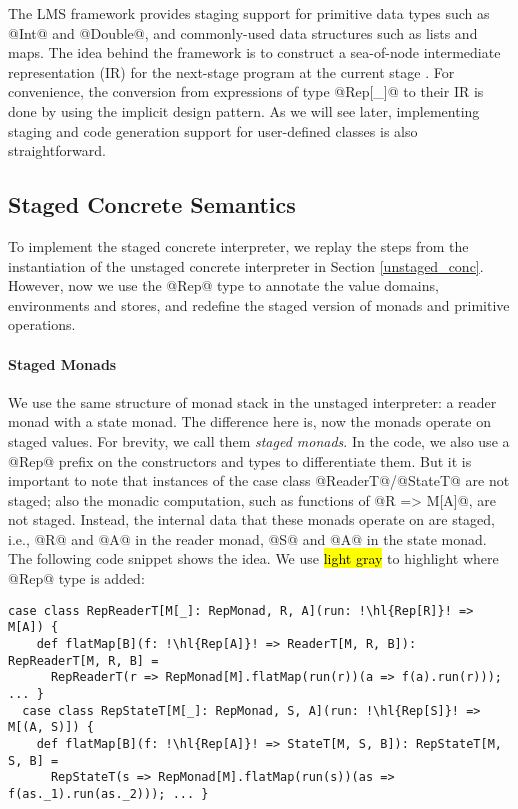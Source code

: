 The LMS framework provides staging support for primitive data types such as
@Int@ and @Double@, and commonly-used data structures such as lists and maps.
The idea behind the framework is to construct a sea-of-node intermediate
representation (IR) for the next-stage program at the current stage
\cite{DBLP:conf/birthday/Rompf16}. For convenience, the conversion from
expressions of type @Rep[_]@ to their IR is done by using the implicit design
pattern. As we will see later, implementing staging and code generation
support for user-defined classes is also straightforward.

\subsection{Staged Concrete Semantics}

To implement the staged concrete interpreter, we replay the steps from the
instantiation of the unstaged concrete interpreter in Section \ref{unstaged_conc}.
However, now we use the @Rep@ type to annotate the value domains, environments and
stores, and redefine the staged version of monads and primitive operations.

\paragraph{Staged Monads}
We use the same structure of monad stack in the unstaged interpreter: a reader
monad with a state monad. The difference here is, now the monads operate on
staged values.  For brevity, we call them \textit{staged monads}. In the code,
we also use a @Rep@ prefix on the constructors and types to differentiate them.
But it is important to note that instances of the case class @ReaderT@/@StateT@
are not staged; also the monadic computation, such as functions of @R => M[A]@,
are not staged. Instead, the internal data that these monads operate on are
staged, i.e., @R@ and @A@ in the reader monad, @S@ and @A@ in the state monad.
The following code snippet shows the idea. We use \hl{light gray} to highlight
where @Rep@ type is added:
\begin{lstlisting}[escapechar=!]
  case class RepReaderT[M[_]: RepMonad, R, A](run: !\hl{Rep[R]}! => M[A]) {
    def flatMap[B](f: !\hl{Rep[A]}! => ReaderT[M, R, B]): RepReaderT[M, R, B] =
      RepReaderT(r => RepMonad[M].flatMap(run(r))(a => f(a).run(r))); ... }
  case class RepStateT[M[_]: RepMonad, S, A](run: !\hl{Rep[S]}! => M[(A, S)]) {
    def flatMap[B](f: !\hl{Rep[A]}! => StateT[M, S, B]): RepStateT[M, S, B] =
      RepStateT(s => RepMonad[M].flatMap(run(s))(as => f(as._1).run(as._2))); ... }
\end{lstlisting}

